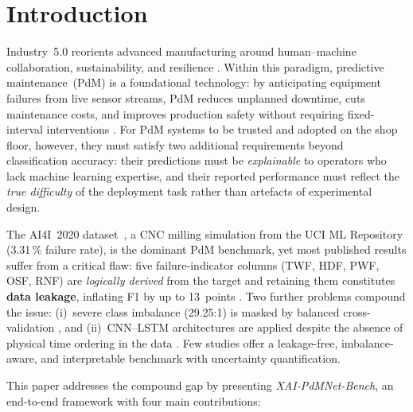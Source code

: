 \documentclass[sensors,article,submit,pdftex,moreauthors]{Definitions/mdpi}
\begin{document}
\section{Introduction}

Industry~5.0 reorients advanced manufacturing around human--machine
collaboration, sustainability, and resilience
\citep{ref-industry50-human2024,ref-industry50-review2023}.
Within this paradigm, predictive maintenance~(PdM) is a foundational
technology: by anticipating equipment failures from live sensor streams,
PdM reduces unplanned downtime, cuts maintenance costs, and improves
production safety without requiring fixed-interval interventions
\citep{ref-aiiot-pdm2025,ref-pdm-review-systematic2024}.
For PdM systems to be trusted and adopted on the shop floor, however,
they must satisfy two additional requirements beyond classification
accuracy: their predictions must be \textit{explainable} to operators
who lack machine learning expertise, and their reported performance
must reflect the \textit{true difficulty} of the deployment task
rather than artefacts of experimental design.

The AI4I~2020 dataset~\citep{ref-ai4i2020}, a CNC milling simulation
from the UCI ML Repository (3.31\,\% failure rate), is the dominant
PdM benchmark, yet most published results suffer from a critical flaw:
five failure-indicator columns (TWF, HDF, PWF, OSF, RNF) are
\textit{logically derived} from the target and retaining them
constitutes \textbf{data leakage}, inflating F1 by up to 13~points
\citep{ref-base-ileri2024}. Two further problems compound the issue:
(i)~severe class imbalance (29.25:1) is masked by balanced
cross-validation \citep{ref-smote-fault2022}, and
(ii)~CNN--LSTM architectures are applied despite the absence of
physical time ordering in the data
\citep{ref-ai4i2020,ref-cnn-lstm-fault2023}. Few studies offer a
leakage-free, imbalance-aware, and interpretable benchmark with
uncertainty quantification.

This paper addresses the compound gap by presenting
\textit{XAI-PdMNet-Bench}, an end-to-end framework with four
main contributions:
\end{document}
